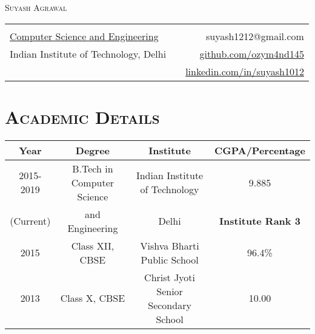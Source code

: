 \documentclass{article}
\newcommand{\tmpsection}[1]{}
\let\tmpsection=\section
\renewcommand{\section}[1]{\tmpsection*{\textsc{#1}}}
\begin{document}

\begin{center}
 {\Large \textsc{Suyash Agrawal} }\\ 
\begin{tabular}{ l p{8cm} r }
    & &   \\
  \href{http://www.cse.iitd.ernet.in/}{Computer Science and Engineering} & & suyash1212@gmail.com \\
  Indian Institute of Technology, Delhi
  & & \href{https://github.com/ozym4nd145/}{github.com/ozym4nd145} \\
  & & \href{https://www.linkedin.com/in/suyash1012}{linkedin.com/in/suyash1012}\\
\end{tabular}
\end{center}


\section{Academic Details}

\begin{center}
\begin{tabular}{ |c | c | c | c |}
\hline
Year & Degree & Institute & CGPA/Percentage \\ 
\hline
2015-2019 & B.Tech in Computer Science & Indian Institute of Technology & 9.885 \\ 
(Current) & and Engineering & Delhi & \textbf{Institute Rank 3}\\
\hline


2015 & Class XII, CBSE & Vishva Bharti Public School & 96.4\% \\ 

\hline
2013 & Class X, CBSE & Christ Jyoti Senior Secondary School & 10.00 \\  \hline
\end{tabular}
\end{center}
\end{document}

